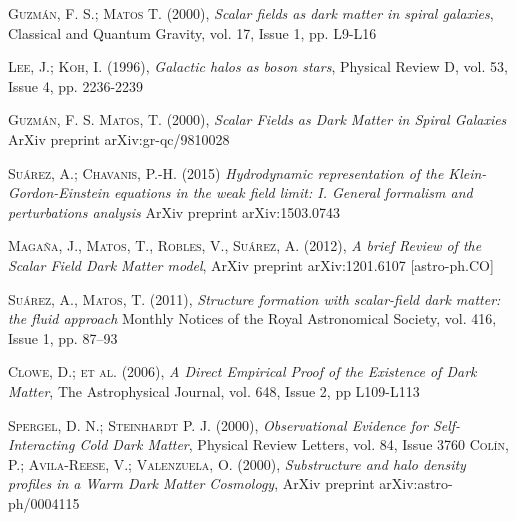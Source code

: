 \documentclass[a4paper,openright,12pt]{book}
\begin{document}
\begin{thebibliography}{a}
 \textsc{Guzmán, F. S.; Matos T. (2000)}, 
\textit{Scalar fields as dark matter in spiral galaxies},
Classical and Quantum Gravity, vol. 17, Issue 1, pp. L9-L16 


 \textsc{Lee, J.; Koh, I. (1996)},
\textit{Galactic halos as boson stars},
Physical Review D, vol. 53, Issue 4, pp. 2236-2239

 \textsc{Guzmán, F. S. Matos, T. (2000)},
\textit{Scalar Fields as Dark Matter in Spiral Galaxies}
ArXiv preprint arXiv:gr-qc/9810028

 \textsc{Suárez, A.; Chavanis, P.-H. (2015)}
\textit{Hydrodynamic representation of the Klein-Gordon-Einstein equations
in the weak field limit: I. General formalism and perturbations analysis}
ArXiv preprint arXiv:1503.0743

 \textsc{Magaña, J., Matos, T., Robles, V., Suárez, A. (2012)},
\textit{A brief Review of the Scalar Field Dark Matter model},
ArXiv preprint arXiv:1201.6107 [astro-ph.CO]

 \textsc{Suárez, A., Matos, T. (2011)},
\textit{Structure formation with scalar-field dark matter: the fluid approach}
Monthly Notices of the Royal Astronomical Society, vol. 416, Issue 1, pp. 87–93


 \textsc{Clowe, D.; et al. (2006)},
\textit{A Direct Empirical Proof of the Existence of Dark Matter},
The Astrophysical Journal, vol. 648, Issue 2, pp L109-L113

 \textsc{Spergel, D. N.; Steinhardt P. J. (2000)},
\textit{Observational Evidence for Self-Interacting Cold Dark Matter},
Physical Review Letters, vol. 84, Issue 3760
 \textsc{Colín, P.; Avila-Reese, V.; Valenzuela, O. (2000)},
\textit{Substructure and halo density profiles in a Warm Dark Matter Cosmology},
ArXiv preprint arXiv:astro-ph/0004115


\end{thebibliography}
\end{document}
